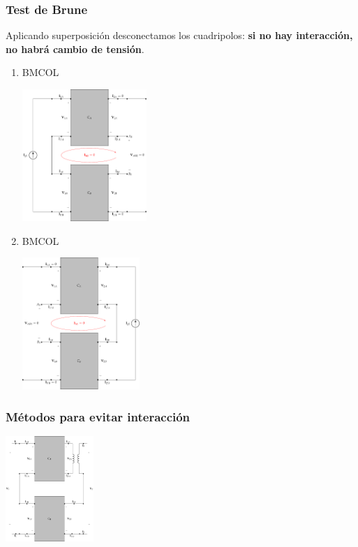 \subsubsection{Test de Brune}
\label{sec:org9a27190}
Aplicando superposición desconectamos los cuadripolos: \textbf{si no hay interacción, no habrá cambio de tensión}.
\begin{enumerate}
\item \hfill{}\textsc{BMCOL}
\label{sec:org3157d40}

\includegraphics[height=5cm]{../figs/serie-serie-brune-entrada.pdf}

\item \hfill{}\textsc{BMCOL}
\label{sec:org355faf6}

\includegraphics[height=5cm]{../figs/serie-serie-brune-salida.pdf}

\end{enumerate}


\subsubsection{Métodos para evitar interacción}
\label{sec:org033b270}

\includegraphics[height=4cm]{../figs/serie-serie-transformador.pdf}


